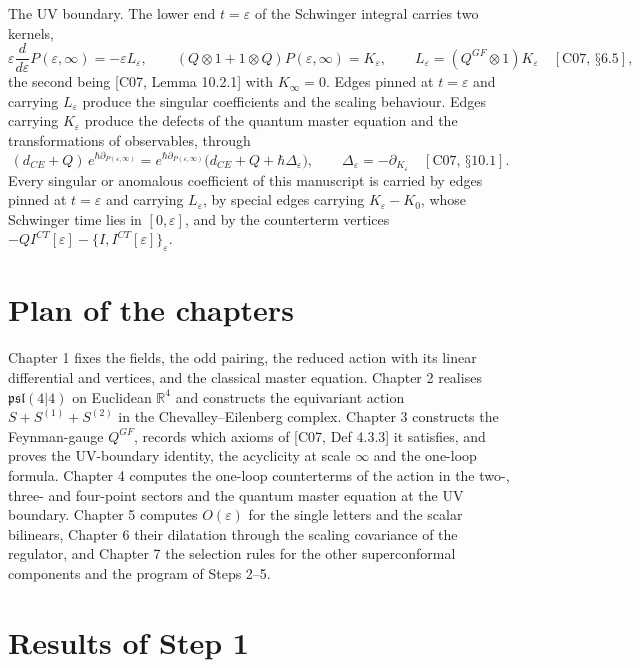The UV boundary. The lower end $t=\varepsilon$ of the Schwinger integral carries two kernels,
\[
\varepsilon\frac{d}{d\varepsilon}P(\varepsilon,\infty)=-\varepsilon L_\varepsilon,\qquad (Q\otimes1+1\otimes Q)P(\varepsilon,\infty)=K_\varepsilon,\qquad L_\varepsilon=(Q^{GF}\otimes1)K_\varepsilon\quad[\text{C07, §6.5}],
\]
the second being [C07, Lemma 10.2.1] with $K_\infty=0$. Edges pinned at $t=\varepsilon$ and carrying $L_\varepsilon$ produce the singular coefficients and the scaling behaviour. Edges carrying $K_\varepsilon$ produce the defects of the quantum master equation and the transformations of observables, through
\[
(d_{CE}+Q)\,e^{\hbar\partial_{P(\varepsilon,\infty)}}=e^{\hbar\partial_{P(\varepsilon,\infty)}}\big(d_{CE}+Q+\hbar\Delta_\varepsilon\big),\qquad \Delta_\varepsilon=-\partial_{K_\varepsilon}\quad[\text{C07, §10.1}].
\]
Every singular or anomalous coefficient of this manuscript is carried by edges pinned at $t=\varepsilon$ and carrying $L_\varepsilon$, by special edges carrying $K_\varepsilon-K_0$, whose Schwinger time lies in $[0,\varepsilon]$, and by the counterterm vertices $-QI^{CT}[\varepsilon]-\{I,I^{CT}[\varepsilon]\}_\varepsilon$.

\section{Plan of the chapters}

Chapter 1 fixes the fields, the odd pairing, the reduced action with its linear differential and vertices, and the classical master equation. Chapter 2 realises $\mathfrak{psl}(4|4)$ on Euclidean $\mathbb R^4$ and constructs the equivariant action $S+S^{(1)}+S^{(2)}$ in the Chevalley--Eilenberg complex. Chapter 3 constructs the Feynman-gauge $Q^{GF}$, records which axioms of [C07, Def 4.3.3] it satisfies, and proves the UV-boundary identity, the acyclicity at scale $\infty$ and the one-loop formula. Chapter 4 computes the one-loop counterterms of the action in the two-, three- and four-point sectors and the quantum master equation at the UV boundary. Chapter 5 computes $O(\varepsilon)$ for the single letters and the scalar bilinears, Chapter 6 their dilatation through the scaling covariance of the regulator, and Chapter 7 the selection rules for the other superconformal components and the program of Steps 2--5.

\section{Results of Step 1}


